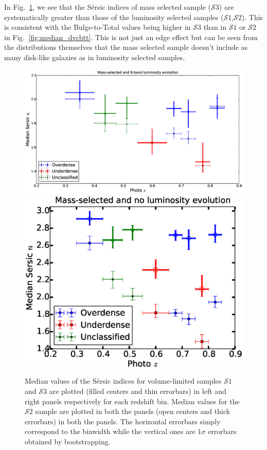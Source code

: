 \documentclass[twocolumn,useAMS,usenatbib]{mn2e}
\newcommand{\sersic}{S\'{e}rsic }
\newcommand{\btt}{Bulge-to-Total }
\newcommand{\s}{\ensuremath{\mathcal{S}}}
\begin{document}
In Fig.~\ref{fig:median_sersicn}, we see that the \sersic indices of mass selected sample (\s$3$) are systematically greater than those of the luminosity selected samples (\s$1$,\s$2$).
This is consistent with the \btt values being higher in \s$3$ than in \s$1$ or \s$2$ in Fig.~\ref{fig:median_dvcbtt}. This is not just an edge effect but can be seen from the distributions themselves 
that the mass selected sample doesn't include as many disk-like galaxies as in luminosity selected samples.
\begin{figure}
 \includegraphics[width=1.0\columnwidth]{median_sersicn}
 \includegraphics[width=1.0\columnwidth]{median_sersicn2}
 \caption{Median values of the \sersic indices for volume-limited samples \s$1$ and \s$3$ are plotted (filled centers and thin errorbars) in left and right panels respectively for each redshift bin.
          Median values for the \s$2$ sample are plotted in both the panels (open centers and thick errorbars) in both the panels.
          The horizontal errorbars simply correspond to the binwidth while the vertical ones are $1\sigma$ errorbars obtained by bootstrapping.}
 \label{fig:median_sersicn}
\end{figure}
\end{document}
